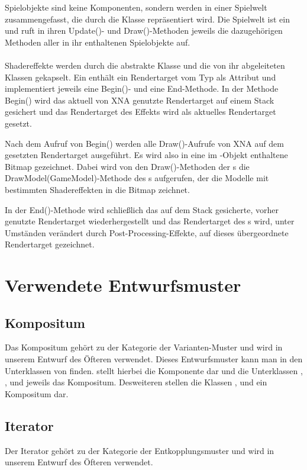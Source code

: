 Spielobjekte sind keine Komponenten, sondern werden in einer Spielwelt zusammengefasst, die durch die Klasse  repräsentiert wird. Die Spielwelt ist ein  und ruft in ihren Update()- und Draw()-Methoden jeweils die dazugehörigen Methoden aller in ihr enthaltenen Spielobjekte auf.
\\\\
Shadereffekte werden durch die abstrakte Klasse  und die von ihr abgeleiteten Klassen gekapselt. Ein  enthält ein Rendertarget vom Typ  als Attribut und implementiert jeweils eine Begin()- und eine End-Methode. In der Methode Begin() wird das aktuell von XNA genutzte Rendertarget auf einem Stack gesichert und das Rendertarget des Effekts wird als aktuelles Rendertarget gesetzt.

Nach dem Aufruf von Begin() werden alle Draw()-Aufrufe von XNA auf dem gesetzten Rendertarget ausgeführt. Es wird also in eine im -Objekt enthaltene Bitmap gezeichnet. Dabei wird von den Draw()-Methoden der s die DrawModel(GameModel)-Methode des s aufgerufen, der die Modelle mit bestimmten Shadereffekten in die Bitmap zeichnet.

In der End()-Methode wird schließlich das auf dem Stack gesicherte, vorher genutzte Rendertarget wiederhergestellt und das Rendertarget des s wird, unter Umständen verändert durch Post-Processing-Effekte, auf dieses übergeordnete Rendertarget gezeichnet.


\section{Verwendete Entwurfsmuster}

\subsection{Kompositum}
Das Kompositum gehört zu der Kategorie der Varianten-Muster und wird in unserem Entwurf des Öfteren verwendet.
Dieses Entwurfsmuster kann man in den Unterklassen von  finden.  stellt hierbei die Komponente dar und die Unterklassen , ,  und  jeweils das Kompositum. 
Desweiteren stellen die Klassen ,  und  ein Kompositum dar.

\subsection{Iterator}
Der Iterator gehört zu der Kategorie der Entkopplungsmuster und wird in unserem Entwurf des Öfteren verwendet.


